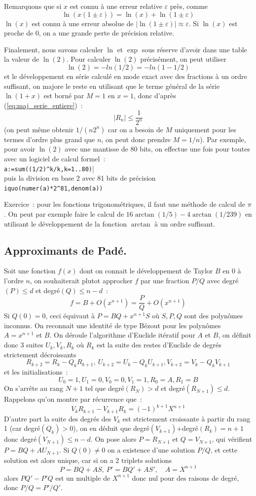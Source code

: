 \documentclass[a4paper,11pt]{article}
\begin{document}
Remarquons que si $x$ est connu \`a une erreur relative $\varepsilon$
pr\`es, comme
\[ \ln(x(1 \pm \varepsilon))=\ln(x) + \ln(1 \pm \varepsilon) \]
$\ln(x)$ est connu \`a une erreur absolue de 
$|\ln(1 \pm \varepsilon)| \approx \varepsilon$. Si $\ln(x)$ est proche
de 0, on a une grande perte de pr\'ecision relative.

Finalement, nous savons calculer $\ln$ et $\exp$ sous r\'eserve
d'avoir dans une table la valeur de $\ln(2)$. Pour calculer
$\ln(2)$ pr\'ecis\'ement, on peut utiliser
\[ \ln(2)=-ln(1/2)=-ln(1-1/2) \]
et le d\'eveloppement en s\'erie calcul\'e en mode exact avec des
fractions \`a un ordre suffisant, on majore le reste en utilisant 
que le terme g\'en\'eral de la s\'erie $\ln(1+x)$ est born\'e par
$M=1$ en $x=1$, donc d'apr\`es (\ref{eq:maj_serie_entiere})~:
\[ |R_n| \leq \frac{1}{2^n}\]
(on peut m\^eme obtenir $1/(n2^n)$ car on a besoin de $M$ uniquement
pour les termes d'ordre plus grand que $n$, on peut donc prendre $M=1/n$).
Par exemple, pour avoir $\ln(2)$ avec une mantisse de 80 bits,
on effectue une fois pour toutes avec un logiciel
de calcul formel~:\\
\verb|a:=sum((1/2)^k/k,k=1..80)||\\
puis la division en base 2 avec 81 bits de pr\'ecision
\verb|iquo(numer(a)*2^81,denom(a))|

Exercice~: pour les fonctions trigonom\'etriques, il faut une
m\'ethode de calcul de $\pi$. On peut par exemple faire le calcul
de $16 \arctan(1/5)-4\arctan(1/239)$ en utilisant le d\'eveloppement
de la fonction $\arctan$ \`a un ordre suffisant.

\subsection{Approximants de Padé.}
Soit une fonction $f(x)$ dont on connait le développement
de Taylor $B$ en 0 à l'ordre $n$, on souhaiterait plutot
approcher $f$ par une fraction $P/Q$ avec degré$(P) \leq d$
et degré$(Q) \leq n-d$~:
$$ f=B+O(x^{n+1})=\frac P Q +O(x^{n+1}) $$
Si $Q(0)=0$, ceci équivaut à $P=BQ+x^{n+1} S$ où $S, P,Q$ sont
des polynômes inconnus. On reconnait une identité de type
Bézout pour les polynômes $A=x^{n+1}$ et $B$.
On déroule l'algorithme d'Euclide itératif pour $A$ et $B$, on définit
donc 3 suites $U_k, V_k, R_k$ où $R_k$ est la suite des restes d'Euclide
de degrés strictement décroissants
$$ R_{k+2}=R_k - Q_k R_{k+1},\ U_{k+2}=U_k - Q_k U_{k+1}, V_{k+2}=V_k - Q_k V_{k+1} $$
et les initialisations~:
$$ U_0=1, U_1=0, V_0=0, V_1=1, R_0=A, R_1=B$$
On s'arrête au rang $N+1$ tel que degré$(R_N)>d$ et degré$(R_{N+1}) \leq d$.
Rappelons qu'on montre par récurrence que~:
$$ V_k R_{k+1} - V_{k+1} R_k = (-1)^{k+1} X^{n+1} $$
D'autre part la suite des degrés des $V_k$ est strictement croissante
à partir du rang 1 (car degré$(Q_k)>0$), on en déduit que
degré$(V_{k+1})$+degré$(R_k)=n+1$ donc degré$(V_{N+1}) \leq n-d$.
On pose alors $P=R_{N+1}$ et $Q=V_{N+1}$, qui vérifient
$P=BQ+AU_{N+1}$.
Si $Q(0) \neq 0$ on a existence d'une solution $P/Q$, 
et cette solution est alors
unique, car si on a 2 triplets solutions
$$ P=BQ+AS, \ P'=BQ'+AS', \quad A=X^{n+1}$$
alors $PQ'-P'Q$ est un multiple de $X^{n+1}$ donc nul pour des raisons
de degré, donc $P/Q=P'/Q'$.
\end{document}
